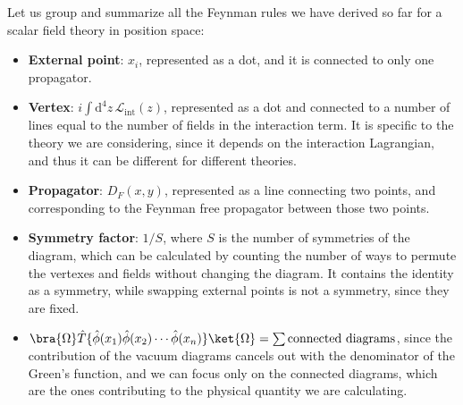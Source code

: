 Let us group and summarize all the Feynman rules we have derived so far for a scalar field theory in position space:

\begin{itemize}
    \item \textbf{External point}: \(x_i\), represented as a dot, and it is connected to only one propagator.
    \item \textbf{Vertex}: \(i \int \mathrm{d}^4 z \, \mathcal{L}_{\text{int}} (z)\), represented as a dot and connected to a number of lines equal to the number of fields in the interaction term. It is specific to the theory we are considering, since it depends on the interaction Lagrangian, and thus it can be different for different theories.
    \item \textbf{Propagator}: \(D_F (x,y)\), represented as a line connecting two points, and corresponding to the Feynman free propagator between those two points.
    \item \textbf{Symmetry factor}: \(1/S\), where \(S\) is the number of symmetries of the diagram, which can be calculated by counting the number of ways to permute the vertexes and fields without changing the diagram. It contains the identity as a symmetry, while swapping external points is not a symmetry, since they are fixed.
    \item \(\bra{\Omega} \hat{T} \{ \hat{\phi} (x_1) \hat{\phi} (x_2) \cdots \hat{\phi} (x_n) \} \ket{\Omega} = \sum \text{connected diagrams}\), since the contribution of the vacuum diagrams cancels out with the denominator of the Green's function, and we can focus only on the connected diagrams, which are the ones contributing to the physical quantity we are calculating.
\end{itemize}
